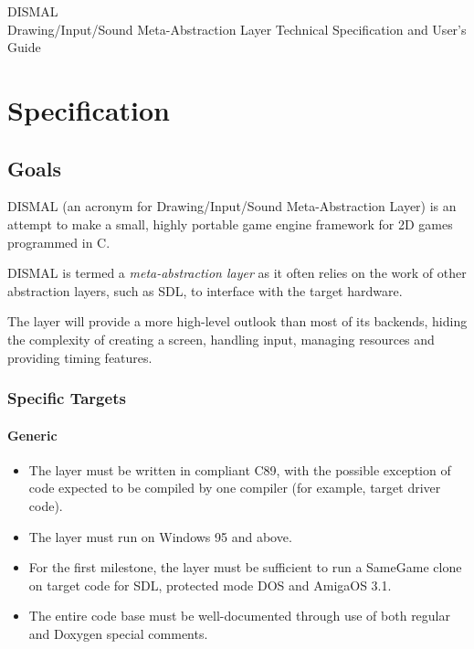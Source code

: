 \documentclass[a4paper]{scrbook}
\begin{document}
\frontmatter

\begin{titlepage}

  \begin{center} 
    \huge{DISMAL}\\
    \bigskip
    \large{Drawing/Input/Sound Meta-Abstraction Layer}
    \vfill
    Technical Specification and User's Guide
  \end{center}

\end{titlepage}


\pagestyle{fancyplain}

\tableofcontents

\mainmatter

\pagestyle{fancy}

\part{Specification}

\chapter{Goals}

DISMAL (an acronym for Drawing/Input/Sound Meta-Abstraction Layer) is
an attempt to make a small, highly portable game engine framework for
2D games programmed in C.

DISMAL is termed a \emph{meta-abstraction layer} as it often relies on
the work of other abstraction layers, such as SDL, to interface with
the target hardware.

The layer will provide a more high-level outlook than most of its
backends, hiding the complexity of creating a screen, handling input,
managing resources and providing timing features.

\section{Specific Targets}

\subsection{Generic}

\begin{itemize}
  \item The layer must be written in compliant C89, with the possible
    exception of code expected to be compiled by one compiler (for
    example, target driver code).
  \item The layer must run on Windows 95 and above.
  \item For the first milestone, the layer must be sufficient to run a
    SameGame clone on target code for SDL, protected mode DOS and
    AmigaOS 3.1.
  \item The entire code base must be well-documented through use of
    both regular and Doxygen special comments.
\end{itemize}
\end{document}
